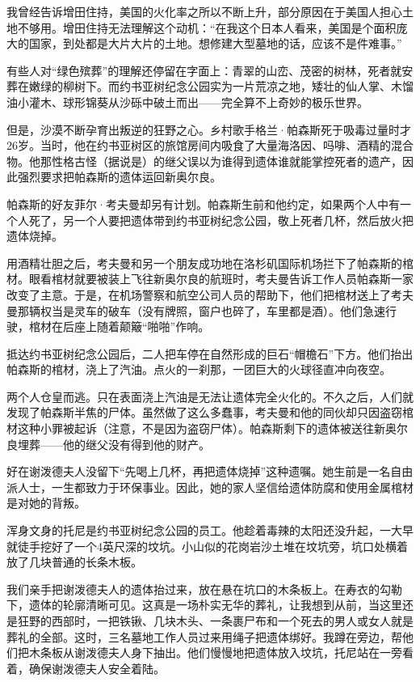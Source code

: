\documentclass[12pt,oneside]{book}
\begin{document}
我曾经告诉增田住持，美国的火化率之所以不断上升，部分原因在于美国人担心土地不够用。增田住持无法理解这个动机：“在我这个日本人看来，美国是个面积庞大的国家，到处都是大片大片的土地。想修建大型墓地的话，应该不是件难事。”

有些人对“绿色殡葬”的理解还停留在字面上：青翠的山峦、茂密的树林，死者就安葬在嫩绿的柳树下。而约书亚树纪念公园实为一片荒凉之地，矮壮的仙人掌、木馏油小灌木、球形锦葵从沙砾中破土而出——完全算不上奇妙的极乐世界。

但是，沙漠不断孕育出叛逆的狂野之心。乡村歌手格兰·帕森斯死于吸毒过量时才26岁。当时，他在约书亚树区的旅馆房间内吸食了大量海洛因、吗啡、酒精的混合物。他那性格古怪（据说是）的继父误以为谁得到遗体谁就能掌控死者的遗产，因此强烈要求把帕森斯的遗体运回新奥尔良。

帕森斯的好友菲尔·考夫曼却另有计划。帕森斯生前和他约定，如果两个人中有一个人死了，另一个人要把遗体带到约书亚树纪念公园，敬上死者几杯，然后放火把遗体烧掉。

用酒精壮胆之后，考夫曼和另一个朋友成功地在洛杉矶国际机场拦下了帕森斯的棺材。眼看棺材就要被装上飞往新奥尔良的航班时，考夫曼告诉工作人员帕森斯一家改变了主意。于是，在机场警察和航空公司人员的帮助下，他们把棺材送上了考夫曼那辆权当是灵车的破车（没有牌照，窗户也碎了，车里都是酒）。他们急速行驶，棺材在后座上随着颠簸“啪啪”作响。

抵达约书亚树纪念公园后，二人把车停在自然形成的巨石“帽檐石”下方。他们抬出帕森斯的棺材，浇上了汽油。点火的一刹那，一团巨大的火球径直冲向夜空。

两个人仓皇而逃。只在表面浇上汽油是无法让遗体完全火化的。不久之后，人们就发现了帕森斯半焦的尸体。虽然做了这么多蠢事，考夫曼和他的同伙却只因盗窃棺材这种小罪被起诉（注意，不是因为盗窃尸体）。帕森斯剩下的遗体被送往新奥尔良埋葬——他的继父没有得到他的财产。

好在谢泼德夫人没留下“先喝上几杯，再把遗体烧掉”这种遗嘱。她生前是一名自由派人士，一生都致力于环保事业。因此，她的家人坚信给遗体防腐和使用金属棺材是对她的背叛。

浑身文身的托尼是约书亚树纪念公园的员工。他趁着毒辣的太阳还没升起，一大早就徒手挖好了一个4英尺深的坟坑。小山似的花岗岩沙土堆在坟坑旁，坑口处横着放了几块普通的长条木板。

我们亲手把谢泼德夫人的遗体抬过来，放在悬在坑口的木条板上。在寿衣的勾勒下，遗体的轮廓清晰可见。这真是一场朴实无华的葬礼，让我想到从前，当这里还是狂野的西部时，一把铁锹、几块木头、一条裹尸布和一个死去的男人或女人就是葬礼的全部。这时，三名墓地工作人员过来用绳子把遗体绑好。我蹲在旁边，帮他们把木条板从谢泼德夫人身下抽出。他们慢慢地把遗体放入坟坑，托尼站在一旁看着，确保谢泼德夫人安全着陆。
\end{document}
